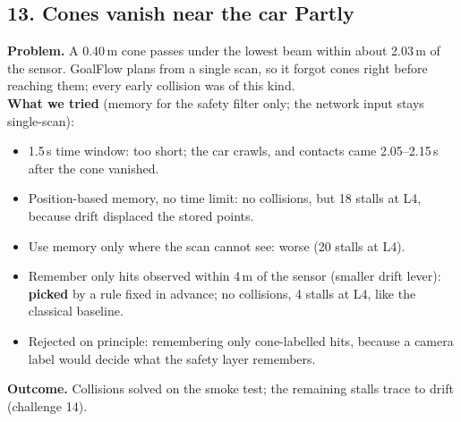\documentclass[11pt,a4paper]{article}
\newcommand{\partly}{\textcolor{accent}{\textbf{Partly}}}
\begin{document}
\subsection*{13. Cones vanish near the car \hfill\partly}
\textbf{Problem.} A 0.40\,m cone passes under the lowest beam within about 2.03\,m of the sensor. GoalFlow plans
from a single scan, so it forgot cones right before reaching them; every early collision was of this kind.\\
\textbf{What we tried} (memory for the safety filter only; the network input stays single-scan):
\begin{itemize}[nosep]
  \item 1.5\,s time window: too short; the car crawls, and contacts came 2.05--2.15\,s after the cone vanished.
  \item Position-based memory, no time limit: no collisions, but 18 stalls at L4, because drift displaced the
        stored points.
  \item Use memory only where the scan cannot see: worse (20 stalls at L4).
  \item Remember only hits observed within 4\,m of the sensor (smaller drift lever): \textbf{picked} by a rule
        fixed in advance; no collisions, 4 stalls at L4, like the classical baseline.
  \item Rejected on principle: remembering only cone-labelled hits, because a camera label would decide what the
        safety layer remembers.
\end{itemize}
\textbf{Outcome.} Collisions solved on the smoke test; the remaining stalls trace to drift (challenge 14).
\end{document}
